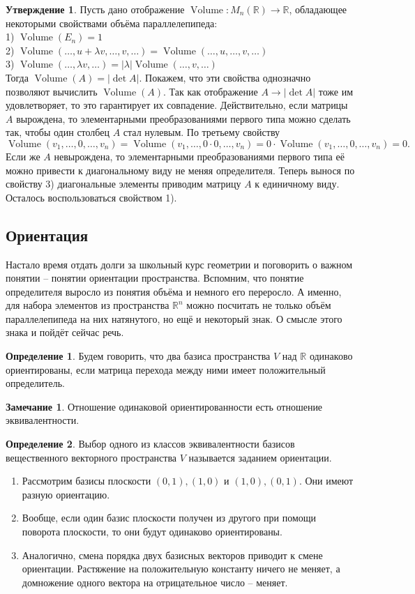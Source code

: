 \documentclass[10pt,a4paper,oneside]{book}
\theoremstyle{definition}
\newtheorem*{rem}{\color{green!50!blue}Замечание}
\newtheorem*{defn}{\color{yellow!30!red} Определение}
\newtheorem{utvr}{\color{blue!50!black}Утверждение}
\newcommand{\mb}[1]{\mathbb{#1}}
\newcommand{\Volume}{\operatorname{Volume}}
\def\exm{\noindent {\bf Примеры:}}
\def\dfn{\begin{defn}}
\def\edfn{\end{defn}}
\def\rm{\begin{rem}}
\def\erm{\end{rem}}
\def\enm{\begin{enumerate}}
\def\eenm{\end{enumerate}}
\def\utv{\begin{utvr}}
\def\eutv{\end{utvr}}
\begin{document}
\utv Пусть дано отображение $\Volume \colon M_n(\mb R) \to \mb R $, обладающее некоторыми свойствами объёма параллелепипеда: \\
1) $\Volume(E_n)=1$\\
2) $\Volume(\dots,u+\lambda v,\dots,v,\dots)=\Volume(\dots,u,\dots,v,\dots)$\\
3) $\Volume(\dots,\lambda v,\dots)=|\lambda|\Volume(\dots,v,\dots)$\\
Тогда $\Volume(A)=|\det A|$.
\proof Покажем, что эти свойства однозначно позволяют вычислить $\Volume(A)$. Так как отображение $A\to |\det A|$ тоже им удовлетворяет, то это гарантирует их совпадение.  Действительно, если матрицы $A$ вырождена, то элементарными преобразованиями первого типа можно сделать так, чтобы один столбец $A$ стал нулевым. По третьему свойству $$\Volume(v_1,\dots,0,\dots,v_n)=\Volume(v_1,\dots,0\cdot 0,\dots,v_n)=0\cdot \Volume(v_1,\dots,0,\dots,v_n)=0.$$
Если же $A$ невырождена, то элементарными преобразованиями первого типа её можно привести к диагональному виду не меняя определителя. Теперь вынося по свойству 3) диагональные элементы приводим матрицу $A$ к единичному виду. Осталось воспользоваться свойством 1).
\endproof
\eutv


\subsection{Ориентация}

Настало время отдать долги за школьный курс геометрии и поговорить о важном понятии -- понятии ориентации пространства.  Вспомним, что понятие определителя выросло из понятия объёма и немного его переросло. А именно, для набора элементов из пространства $\mb R^n$ можно посчитать не только объём параллелепипеда на них натянутого, но ещё и некоторый знак. О смысле этого знака и пойдёт сейчас речь.



\dfn Будем говорить, что два базиса пространства $V$ над $\mb R$ одинаково ориентированы, если матрица перехода между ними имеет положительный определитель.
\edfn

\rm Отношение одинаковой ориентированности есть отношение эквивалентности.
\erm

\dfn Выбор одного из классов эквивалентности базисов вещественного векторного пространства $V$ называется заданием ориентации.
\edfn

\exm
\enm
\item Рассмотрим базисы  плоскости $(0,1),(1,0)$ и $(1,0),(0,1)$.  Они имеют разную ориентацию. 
\item Вообще, если один базис плоскости получен из другого при помощи поворота плоскости, то они будут одинаково ориентированы.
\item Аналогично, смена порядка двух базисных векторов приводит к смене ориентации. Растяжение на положительную константу ничего не меняет, а домножение одного вектора на отрицательное число -- меняет.
\eenm
\end{document}
